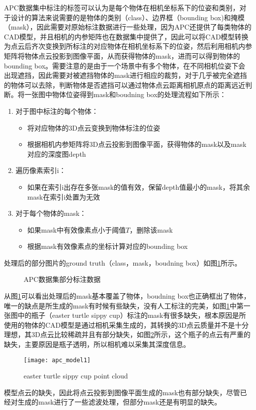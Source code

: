 APC数据集中标注的标签可以认为是每个物体在相机坐标系下的位姿和类别，对于设计的算法来说需要的是物体的类别（class）、边界框（bounding box)和掩模（mask），因此需要对原始标注数据进行一些处理，因为APC还提供了每类物体的CAD模型，并且相机的内参矩阵也在数据集中提供了，因此可以将CAD模型转换为点云后齐次变换到所标注的对应物体在相机坐标系下的位姿，然后利用相机内参矩阵将物体点云投影到图像平面，从而获得物体的mask，进而可以得到物体的bounding box。需要注意的是由于一个场景中有多个物体，在不同相机位姿下会出现遮挡，因此需要对被遮挡物体的mask进行相应的裁剪，对于几乎被完全遮挡的物体可以去除，判断物体是否遮挡可以通过物体点云距离相机原点的距离远近判断。将一张图中物体位姿得到mask和boudning box的处理流程如下所示：
\begin{enumerate}
\item 对于图中标注的每个物体：
  \begin{itemize}
  \item 将对应物体的3D点云变换到物体标注的位姿
  \item 根据相机内参矩阵将3D点云投影到图像平面，获得物体的mask以及mask对应的深度图depth
  \end{itemize}
\item 遍历像素索引i：
  \begin{itemize}
  \item 如果在索引i出存在多张mask的值有效，保留depth值最小的mask，将其余mask在索引i处置为无效
  \end{itemize}
\item 对于每个物体的mask：
  \begin{itemize}
  \item 如果mask中有效像素点小于阈值$T$，删除该mask
  \item 根据mask有效像素点的坐标计算对应的bounding box
  \end{itemize}
\end{enumerate}
处理后的部分图片的ground truth（class，mask，boudning box）如图\ref{fig:apc_gt}所示。
\begin{figure}[ht]
  \centering
  \hskip1cm
  \vfill
  \hskip1cm
  \caption{APC数据集部分标注数据}
  \label{fig:apc_gt}
\end{figure}
从图\ref{fig:apc_gt}可以看出处理后的mask基本覆盖了物体，boudning box也正确框出了物体，唯一的缺点是所生成的mask有时候有些缺失，没有人工标注的完美，如图\ref{fig:apc_gt}中第一张图中的瓶子（easter turtle sippy cup）标注的mask有很多缺失，根本原因是所使用的物体的CAD模型是通过相机采集生成的，其转换的3D点云质量并不是十分理想，其3D点云比较稀疏并且有部分缺失，如图\ref{fig:apc_model}所示，这个瓶子的点云有严重的缺失，主要原因是瓶子透明，所以相机难以采集其深度信息。
\begin{figure}[ht]
  \centering
  \texttt{[image: apc\_model1]}
  \caption{easter turtle sippy cup point cloud}
  \label{fig:apc_model}
\end{figure}
模型点云的缺失，因此将点云投影到图像平面生成的mask也有部分缺失，尽管已经对生成的mask进行了一些滤波处理，但部分mask还是有明显的缺失。

